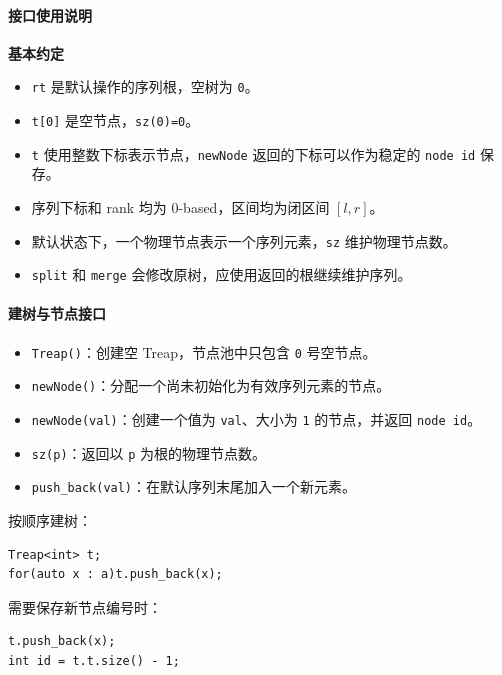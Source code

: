 \paragraph*{接口使用说明}

\textbf{基本约定}

\begin{itemize}
  \item \texttt{rt} 是默认操作的序列根，空树为 \texttt{0}。
  \item \texttt{t[0]} 是空节点，\texttt{sz(0)=0}。
  \item \texttt{t} 使用整数下标表示节点，\texttt{newNode} 返回的下标可以作为稳定的 \texttt{node id} 保存。
  \item 序列下标和 rank 均为 0-based，区间均为闭区间 $[l,r]$。
  \item 默认状态下，一个物理节点表示一个序列元素，\texttt{sz} 维护物理节点数。
  \item \texttt{split} 和 \texttt{merge} 会修改原树，应使用返回的根继续维护序列。
\end{itemize}

\paragraph*{建树与节点接口}

\begin{itemize}
  \item \texttt{Treap()}：创建空 Treap，节点池中只包含 \texttt{0} 号空节点。
  \item \texttt{newNode()}：分配一个尚未初始化为有效序列元素的节点。
  \item \texttt{newNode(val)}：创建一个值为 \texttt{val}、大小为 \texttt{1} 的节点，并返回 \texttt{node id}。
  \item \texttt{sz(p)}：返回以 \texttt{p} 为根的物理节点数。
  \item \texttt{push\_back(val)}：在默认序列末尾加入一个新元素。
\end{itemize}

按顺序建树：

\begin{verbatim}
Treap<int> t;
for(auto x : a)t.push_back(x);
\end{verbatim}

需要保存新节点编号时：

\begin{verbatim}
t.push_back(x);
int id = t.t.size() - 1;
\end{verbatim}

